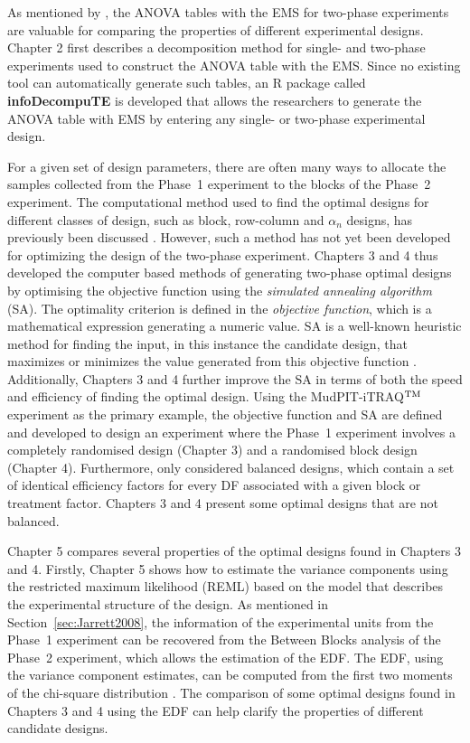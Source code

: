 \documentclass[11pt,a4paper]{article}
\begin{document}
As mentioned by \cite{Brien2011}, the ANOVA tables with the EMS for two-phase experiments are valuable for comparing the properties of different experimental designs. Chapter 2 first describes a decomposition method for single- and two-phase experiments used to construct the ANOVA table with the EMS. Since no existing tool can automatically generate such tables, an \textsf{R} package called \textbf{infoDecompuTE} is developed that allows the researchers to generate the ANOVA table with EMS by entering any single- or two-phase experimental design. 

For a given set of design parameters, there are often many ways to allocate the samples collected from the Phase~1 experiment to the blocks of the Phase~2 experiment. The computational method used to find the optimal designs for different classes of design, such as block, row-column and $\alpha_n$ designs, has previously been discussed \citep{whitaker1990, Williams1996, John2002}. However, such a method has not yet been developed for optimizing the design of the two-phase experiment. Chapters 3 and 4 thus developed the computer based methods of generating two-phase optimal designs by optimising the objective function using the \emph{simulated annealing algorithm} (SA). The optimality criterion is defined in the \emph{objective function}, which is a mathematical expression generating a numeric value. SA is a well-known heuristic method for finding the input, in this instance the candidate design, that maximizes or minimizes the value generated from this objective function \citep{Kirkpatrick1983}. Additionally, Chapters 3 and 4 further improve the SA in terms of both the speed and efficiency of finding the optimal design. Using the MudPIT-iTRAQ$^{\rm TM}$ experiment as the primary example, the objective function and SA are defined and developed to design an experiment where the Phase~1 experiment involves a completely randomised design (Chapter 3) and a randomised block design (Chapter 4). Furthermore, \cite{Brien2009, Brien2010} only considered balanced designs, which contain a set of identical efficiency factors for every DF associated with a given block or treatment factor. Chapters 3 and 4 present some optimal designs that are not balanced.


Chapter 5 compares several properties of the optimal designs found in Chapters 3 and 4. Firstly, Chapter 5 shows how to estimate the variance components using the restricted maximum likelihood (REML) based on the model that describes the experimental structure of the design. As mentioned in Section~\ref{sec:Jarrett2008}, the information of the experimental units from the Phase~1 experiment can be recovered from the Between Blocks analysis of the Phase~2 experiment, which allows the estimation of the EDF. The EDF, using the variance component estimates, can be computed from the first two moments of the chi-square distribution \citep{Satterthwaite1946}. The comparison of some optimal designs found in Chapters 3 and 4 using the EDF can help clarify the properties of different candidate designs. 
\end{document}
